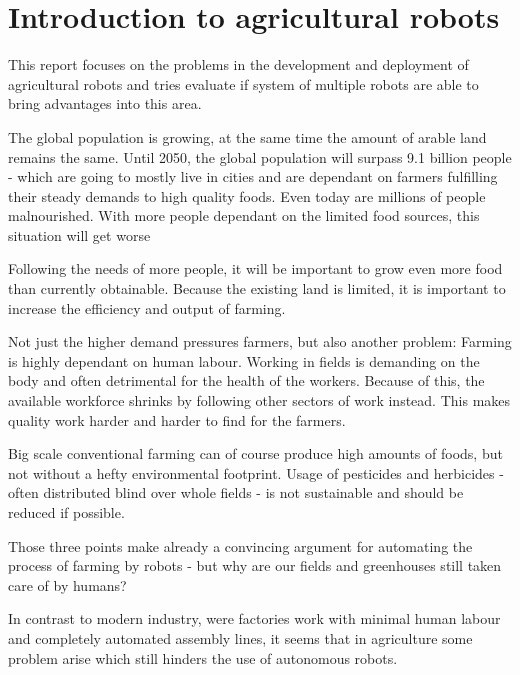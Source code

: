 \newcommand*\rot{\rotatebox{90}}

    \chapter{Introduction to agricultural robots}

    This report focuses on the problems in the development and deployment of agricultural robots and tries evaluate if system of multiple robots are able to bring advantages into this area.

    The global population is growing, at the same time the amount of arable land remains the same. Until 2050, the global population will surpass 9.1 billion people - which are going to mostly live in cities and are dependant on farmers fulfilling their steady demands to high quality foods. Even today are millions of people malnourished. With more people dependant on the limited food sources, this situation will get worse \cite{FAO2021}
    
    Following the needs of more people, it will be important to grow even more food than currently obtainable. Because the existing land is limited, it is important to increase the efficiency and output of farming. 

    Not just the higher demand pressures farmers, but also another problem: Farming is highly dependant on human labour. Working in fields is demanding on the body and often detrimental for the health of the workers. Because of this, the available workforce shrinks by following other sectors of work instead. This makes quality work harder and harder to find for the farmers. \cite{Vasconez2019}

    Big scale conventional farming can of course produce high amounts of foods, but not without a hefty environmental footprint. Usage of pesticides and herbicides - often distributed blind over whole fields - is not sustainable and should be reduced if possible. \cite{ConesaMunoz2015}

    Those three points make already a convincing argument for automating the process of farming by robots - but why are our fields and greenhouses still taken care of by humans? 

    In contrast to modern industry, were factories work with minimal human labour and completely automated assembly lines, it seems that in agriculture some problem arise which still hinders the use of autonomous robots. 

